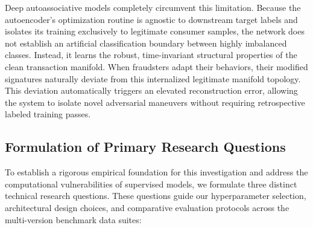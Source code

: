 \documentclass[11pt,a4paper]{report}
\begin{document}
Deep autoassociative models completely circumvent this limitation. Because the autoencoder's optimization routine is agnostic to downstream target labels and isolates its training exclusively to legitimate consumer samples, the network does not establish an artificial classification boundary between highly imbalanced classes. Instead, it learns the robust, time-invariant structural properties of the clean transaction manifold. When fraudsters adapt their behaviors, their modified signatures naturally deviate from this internalized legitimate manifold topology. This deviation automatically triggers an elevated reconstruction error, allowing the system to isolate novel adversarial maneuvers without requiring retrospective labeled training passes.

\subsection{Formulation of Primary Research Questions}
To establish a rigorous empirical foundation for this investigation and address the computational vulnerabilities of supervised models, we formulate three distinct technical research questions. These questions guide our hyperparameter selection, architectural design choices, and comparative evaluation protocols across the multi-version benchmark data suites:
\end{document}
